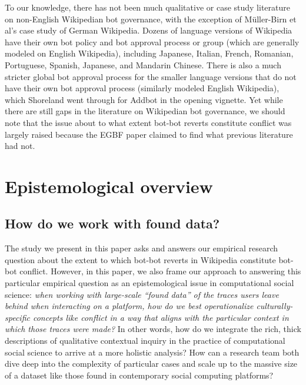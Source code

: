 \documentclass[format=acmsmall, review=false, screen=true]{acmart}%
\begin{document}
To our knowledge, there has not been much qualitative or case study literature on non-English Wikipedian bot governance, with the exception of M{\"{u}}ller-Birn et al's case study of German Wikipedia. Dozens of language versions of Wikipedia have their own bot policy and bot approval process or group (which are generally modeled on English Wikipedia), including Japanese, Italian, French, Romanian, Portuguese, Spanish, Japanese, and Mandarin Chinese. There is also a much stricter global bot approval process for the smaller language versions that do not have their own bot approval process (similarly modeled English Wikipedia), which Shoreland went through for Addbot in the opening vignette. Yet while there are still gaps in the literature on Wikipedian bot governance, we should note that the issue about to what extent bot-bot reverts constitute conflict was largely raised because the EGBF paper claimed to find what previous literature had not. 

\section{Epistemological overview} \label{s:epist}
\subsection{How do we work with found data?} \label{s:epist:found}
The study we present in this paper asks and answers our empirical research question about the extent to which bot-bot reverts in Wikipedia constitute bot-bot conflict. However, in this paper, we also frame our approach to answering this particular empirical question as an epistemological issue in computational social science: \textit{when working with large-scale ``found data'' \cite{Harford2014} of the traces users leave behind when interacting on a platform, how do we best operationalize culturally-specific concepts like conflict in a way that aligns with the particular context in which those traces were made?} In other words, how do we integrate the rich, thick descriptions of qualitative contextual inquiry in the practice of computational social science to arrive at a more holistic analysis? How can a research team both dive deep into the complexity of particular cases and scale up to the massive size of a dataset like those found in contemporary social computing platforms?
\end{document}
